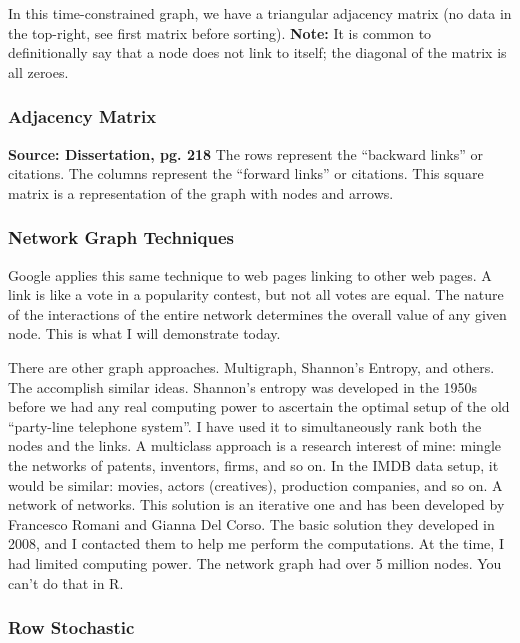\documentclass[
]{article}
\begin{document}
In this time-constrained graph, we have a triangular adjacency matrix
(no data in the top-right, see first matrix before sorting).
\textbf{Note:} It is common to definitionally say that a node does not
link to itself; the diagonal of the matrix is all zeroes.

\hypertarget{adjacency-matrix}{%
\subsubsection{Adjacency Matrix}\label{adjacency-matrix}}

\textbf{Source: Dissertation, pg. 218} The rows represent the ``backward
links'' or citations. The columns represent the ``forward links'' or
citations. This square matrix is a representation of the graph with
nodes and arrows.

\hypertarget{network-graph-techniques}{%
\subsubsection{Network Graph
Techniques}\label{network-graph-techniques}}

Google applies this same technique to web pages linking to other web
pages. A link is like a vote in a popularity contest, but not all votes
are equal. The nature of the interactions of the entire network
determines the overall value of any given node. This is what I will
demonstrate today.

There are other graph approaches. Multigraph, Shannon's Entropy, and
others. The accomplish similar ideas. Shannon's entropy was developed in
the 1950s before we had any real computing power to ascertain the
optimal setup of the old ``party-line telephone system''. I have used it
to simultaneously rank both the nodes and the links. A multiclass
approach is a research interest of mine: mingle the networks of patents,
inventors, firms, and so on. In the IMDB data setup, it would be
similar: movies, actors (creatives), production companies, and so on. A
network of networks. This solution is an iterative one and has been
developed by Francesco Romani and Gianna Del Corso. The basic solution
they developed in 2008, and I contacted them to help me perform the
computations. At the time, I had limited computing power. The network
graph had over 5 million nodes. You can't do that in R.

\hypertarget{row-stochastic}{%
\subsubsection{Row Stochastic}\label{row-stochastic}}
\end{document}
